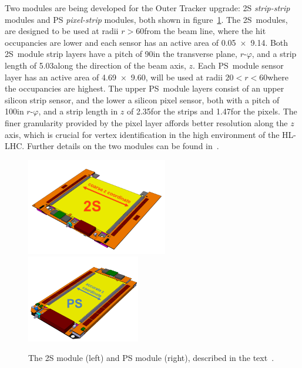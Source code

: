 Two \pT modules are being developed for the Outer Tracker upgrade: 2S \emph{strip-strip} modules and PS \emph{pixel-strip} modules, both shown in figure~\ref{fig:2Spsmodules}.
The 2S~modules, are designed to be used at radii $r>60$\cm from the beam line, where the hit occupancies are lower and each sensor has an active area of 0.05\cm~$\times$~9.14\cm.
Both 2S~module strip layers have a pitch of 90\mum in the transverse plane, $r$-$\varphi$, and a strip length of 5.03\cm along the direction of the beam axis, $z$.
Each PS~module sensor layer has an active area of 4.69\cm~$\times$~9.60\cm, will be used at radii $20<r<60$\cm where the occupancies are highest.
The upper PS~module layers consist of an upper silicon strip sensor, and the lower a silicon pixel sensor, both with a pitch of 100\mum in $r$-$\varphi$, and a strip length in $z$ of 2.35\cm for the strips and 1.47\mm for the pixels.
The finer granularity provided by the pixel layer affords better resolution along the $z$ axis, which is crucial for vertex identification in the high \PU environment of the HL-LHC.
Further details on the two \pT modules can be found in~\cite{CMS_Upgrade_TP,P2TrackerTDR}.
 
\begin{figure}[tp]
\centering
\includegraphics[width=0.55\textwidth,trim={0truecm 0truecm 0truecm 1truecm},clip]{figs/tk-upgrade/2S_assembled.png}
\hfill
\includegraphics[width=0.44\textwidth,trim={0truecm 0truecm 0truecm 1truecm},clip]{figs/tk-upgrade/PS_assembled.png}
\caption{The 2S module (left) and PS module (right), described in the text~\cite{P2TrackerTDR}.}
\label{fig:2Spsmodules}
\end{figure}

